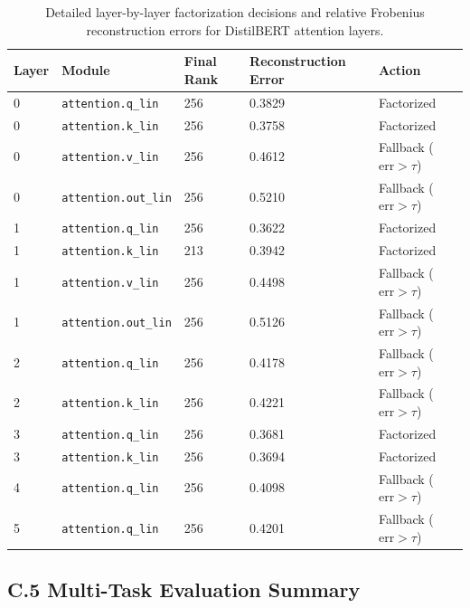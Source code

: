 \begin{table}[H]
\centering
\small
\begin{tabular}{lllll}
\toprule
\textbf{Layer} & \textbf{Module} & \textbf{Final Rank} & \textbf{Reconstruction Error} & \textbf{Action} \\
\midrule
0 & \texttt{attention.q\_lin} & 256 & 0.3829 & Factorized \\
0 & \texttt{attention.k\_lin} & 256 & 0.3758 & Factorized \\
0 & \texttt{attention.v\_lin} & 256 & 0.4612 & Fallback ($\mathrm{err} > \tau$) \\
0 & \texttt{attention.out\_lin} & 256 & 0.5210 & Fallback ($\mathrm{err} > \tau$) \\
1 & \texttt{attention.q\_lin} & 256 & 0.3622 & Factorized \\
1 & \texttt{attention.k\_lin} & 213 & 0.3942 & Factorized \\
1 & \texttt{attention.v\_lin} & 256 & 0.4498 & Fallback ($\mathrm{err} > \tau$) \\
1 & \texttt{attention.out\_lin} & 256 & 0.5126 & Fallback ($\mathrm{err} > \tau$) \\
2 & \texttt{attention.q\_lin} & 256 & 0.4178 & Fallback ($\mathrm{err} > \tau$) \\
2 & \texttt{attention.k\_lin} & 256 & 0.4221 & Fallback ($\mathrm{err} > \tau$) \\
3 & \texttt{attention.q\_lin} & 256 & 0.3681 & Factorized \\
3 & \texttt{attention.k\_lin} & 256 & 0.3694 & Factorized \\
4 & \texttt{attention.q\_lin} & 256 & 0.4098 & Fallback ($\mathrm{err} > \tau$) \\
5 & \texttt{attention.q\_lin} & 256 & 0.4201 & Fallback ($\mathrm{err} > \tau$) \\
\bottomrule
\end{tabular}
\caption{Detailed layer-by-layer factorization decisions and relative Frobenius reconstruction errors for DistilBERT attention layers.}
\label{tab:distilbert_layer_detail}
\end{table}

\subsection{C.5 Multi-Task Evaluation Summary}


